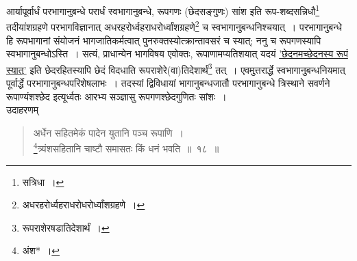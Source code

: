 \documentclass[10pt, openany]{book}
\begin{document}
{आर्यापूर्वार्धं परभागानुबन्धे परार्धं स्वभागानुबन्धे, रूपगणः
(छेदसङ्गुणः) सांश इति}
{रूप-शब्दसन्निधौ\renewcommand{\thefootnote}{\s १}\footnote{\s *सत्रिधा~।}  तदीयांशग्रहणे परभागविज्ञानात्
अधरहरोर्ध्वहराधरोर्ध्वांशग्रहणे\renewcommand{\thefootnote}{\s २}\footnote{\s अधरहरोर्ध्वहराधरोधरोर्ध्वांशग्रहणे~।} च स्वभागानुबन्धनिश्चयात्~। परभागानुबन्धे हि रूपभागानां संयोजनं भागजातिकर्मत्वात्
पुनरुक्तस्योत्क्रान्तावसरं च स्यात्; ननु च रूपगणस्यापि स्वभागानुबन्धोऽस्ति~। सत्यं,
प्राधान्येन भागविषय एवोक्तः, रूपाणामप्यतिशयात् यदयं \hyperref[32.1]{'छेदनमच्छेदनस्य रूपं स्यात्'} इति
छेदरहितस्यापि}
{छेदं विदधाति रूपराशेरे(वा)तिदेशार्थं\renewcommand{\thefootnote}{\s ३}\footnote{\s रूपराशेरषडातिदेशार्थं~।} तत्~। एवमुत्तरार्द्धे
स्वभागानुबन्धनियमात् पूर्वार्द्धे}
{परभागानुबन्धपरिशेषलाभः~। तदस्यां द्विविधायां भागानुबन्धजातौ
परभागानुबन्धे त्रिस्थाने}
{सवर्णने रूपाण्यंशश्छेद इत्यूर्ध्वतः आरभ्य सञ्ज्ञासु रूपगणश्छेदगुणितः
सांशः~।}\\

{उदाहरणम्\textemdash}

\begin{quote}{\eg अर्धेन सहितमेकं पादेन युतानि पञ्च रूपाणि~। \\
\renewcommand{\thefootnote}{\s ४}\footnote{\s अंश*~।}त्र्यंशसहितानि चाष्टौ समासतः किं धनं भवति~॥~१८~॥}\end{quote}
\end{document}

